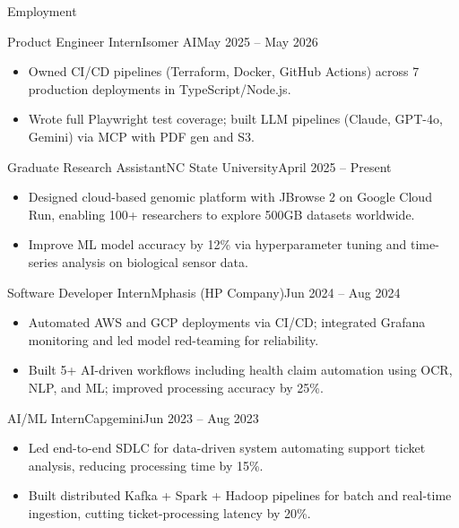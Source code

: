 \documentclass[]{mcdowellcv}
\begin{document}
\makeheader

\begin{cvsection}{Employment}
  \begin{cvsubsection}{Product Engineer Intern}{Isomer AI}{May 2025 -- May 2026}
    \begin{itemize}
      \item Owned CI/CD pipelines (Terraform, Docker, GitHub Actions) across 7 production deployments in TypeScript/Node.js.
      \item Wrote full Playwright test coverage; built LLM pipelines (Claude, GPT-4o, Gemini) via MCP with PDF gen and S3.
    \end{itemize}
    \vspace{-1.5pt}
  \end{cvsubsection}

  \begin{cvsubsection}{Graduate Research Assistant}{NC State University}{April 2025 -- Present}
    \begin{itemize}
      \item Designed cloud-based genomic platform with JBrowse 2 on Google Cloud Run, enabling 100+ researchers to explore 500GB datasets worldwide.
      \item Improve ML model accuracy by 12\% via hyperparameter tuning and time-series analysis on biological sensor data.
    \end{itemize}
    \vspace{-1.5pt}
  \end{cvsubsection}

  \begin{cvsubsection}{Software Developer Intern}{Mphasis (HP Company)}{Jun 2024 -- Aug 2024}
    \begin{itemize}
      \item Automated AWS and GCP deployments via CI/CD; integrated Grafana monitoring and led model red-teaming for reliability.
      \item Built 5+ AI-driven workflows including health claim automation using OCR, NLP, and ML; improved processing accuracy by 25\%.
    \end{itemize}
    \vspace{-1.5pt}
  \end{cvsubsection}

  \begin{cvsubsection}{AI/ML Intern}{Capgemini}{Jun 2023 -- Aug 2023}
    \begin{itemize}
      \item Led end-to-end SDLC for data-driven system automating support ticket analysis, reducing processing time by 15\%.
      \item Built distributed Kafka + Spark + Hadoop pipelines for batch and real-time ingestion, cutting ticket-processing latency by 20\%.
    \end{itemize}
    \vspace{-1.5pt}
  \end{cvsubsection}
\end{cvsection}
\end{document}
